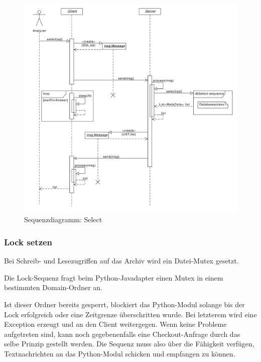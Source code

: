 \begin{figure}[H]
	\centering
	\label{dia:design:frontend:sqc:select}
	\includegraphics[width=\textwidth]{design/frontend/sequence/select-sequence.pdf}
	\caption{Sequenzdiagramm: Select}
\end{figure}

\subsubsection{Lock setzen}

Bei Schreib- und Lesezugriffen auf das Archiv wird ein Datei-Mutex gesetzt.

Die Lock-Sequenz fragt beim Python-Javadapter einen Mutex in einem bestimmten Domain-Ordner an.

Ist dieser Ordner bereits gesperrt, blockiert das Python-Modul solange bis der Lock erfolgreich oder eine Zeitgrenze überschritten wurde.
Bei letzterem wird eine Exception erzeugt und an den Client weitergegen.
Wenn keine Probleme aufgetreten sind, kann noch gegebenenfalls eine Checkout-Anfrage durch das selbe Prinzip gestellt werden.
Die Sequenz muss also über die Fähigkeit verfügen, Textnachrichten an das Python-Modul schicken und empfangen zu können.


